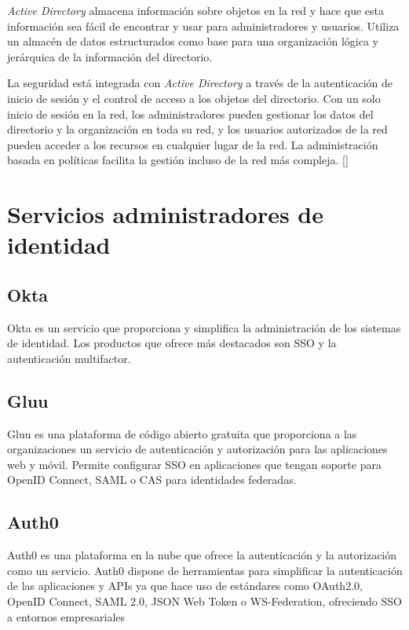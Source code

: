 \textit{Active Directory} almacena información sobre objetos en la red y hace que esta información sea fácil de encontrar y usar para administradores y usuarios. Utiliza un almacén de datos estructurados como base para una organización lógica y jerárquica de la información del directorio.

La seguridad está integrada con \textit{Active Directory }a través de la autenticación de inicio de sesión y el control de acceso a los objetos del directorio. Con un solo inicio de sesión en la red, los administradores pueden gestionar los datos del directorio y la organización en toda su red, y los usuarios autorizados de la red pueden acceder a los recursos en cualquier lugar de la red. La administración basada en políticas facilita la gestión incluso de la red más compleja.
[\cite{active-directoy-doc}]



\section{Servicios administradores de identidad} \label{user-admin}

\subsection{Okta}
Okta es un servicio que proporciona y simplifica la administración de los sistemas de identidad. Los productos que ofrece más destacados son SSO y la autenticación multifactor.

%

\subsection{Gluu}
Gluu es una plataforma de código abierto gratuita que proporciona a las organizaciones un servicio de autenticación y autorización para las aplicaciones web y móvil. Permite configurar SSO en aplicaciones que tengan soporte para OpenID Connect, SAML o  CAS para identidades federadas.

\subsection{Auth0}
Auth0 es una plataforma en la nube que ofrece la autenticación y la autorización como un servicio. Auth0 dispone de herramientas para simplificar la autenticación de las aplicaciones y APIs ya que hace uso de estándares como OAuth2.0, OpenID Connect, SAML 2.0, JSON Web Token o WS-Federation, ofreciendo SSO a entornos empresariales

